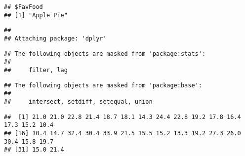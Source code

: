 \documentclass[
]{article}
\newenvironment{Shaded}{\begin{snugshade}}{\end{snugshade}}
\newcommand{\CommentTok}[1]{\textcolor[rgb]{0.56,0.35,0.01}{\textit{#1}}}
\newcommand{\DecValTok}[1]{\textcolor[rgb]{0.00,0.00,0.81}{#1}}
\newcommand{\KeywordTok}[1]{\textcolor[rgb]{0.13,0.29,0.53}{\textbf{#1}}}
\newcommand{\NormalTok}[1]{#1}
\newcommand{\OperatorTok}[1]{\textcolor[rgb]{0.81,0.36,0.00}{\textbf{#1}}}
\newcommand{\StringTok}[1]{\textcolor[rgb]{0.31,0.60,0.02}{#1}}
\begin{document}
\begin{verbatim}
## $FavFood
## [1] "Apple Pie"
\end{verbatim}

\begin{Shaded}
\end{Shaded}

\begin{verbatim}
## 
## Attaching package: 'dplyr'
\end{verbatim}

\begin{verbatim}
## The following objects are masked from 'package:stats':
## 
##     filter, lag
\end{verbatim}

\begin{verbatim}
## The following objects are masked from 'package:base':
## 
##     intersect, setdiff, setequal, union
\end{verbatim}

\begin{Shaded}
\end{Shaded}

\begin{verbatim}
##  [1] 21.0 21.0 22.8 21.4 18.7 18.1 14.3 24.4 22.8 19.2 17.8 16.4 17.3 15.2 10.4
## [16] 10.4 14.7 32.4 30.4 33.9 21.5 15.5 15.2 13.3 19.2 27.3 26.0 30.4 15.8 19.7
## [31] 15.0 21.4
\end{verbatim}

\begin{Shaded}
\end{Shaded}
\end{document}
